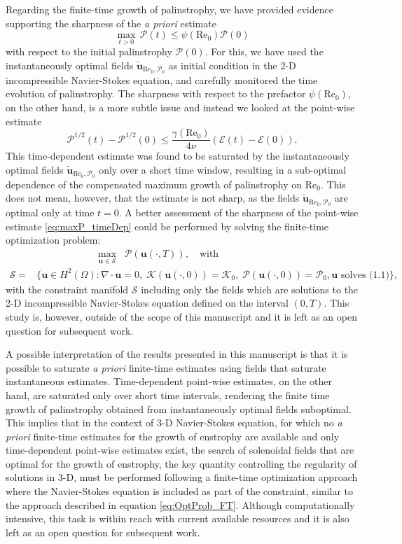 \documentclass[11pt]{article}
\def\E{{\mathcal{E}}}
\def\P{{\mathcal{P}}}
\def\K{{\mathcal{K}}}
\newcommand{\uvec}{\mathbf{u}}
\newcommand{\Reyn}{\textrm{Re}}
\newcommand{\tuvecRP}{\widetilde{\mathbf{u}}_{\Reyn_0,\P_0}}
\begin{document}
Regarding the finite-time growth of palinstrophy, we have provided evidence supporting the sharpness of the \emph{a priori} estimate
\[
\mathop{\max}_{t > 0} \, \P(t) \leq \psi(\Reyn_0) \P(0)
\]
with respect to the initial palinstrophy $\P(0)$. For this, we have used the instantaneously optimal fields $\tuvecRP$ as initial condition in the 2-D incompressible Navier-Stokes equation, and carefully monitored the time evolution of palinstrophy. The sharpness with respect to the prefactor $\psi(\Reyn_0)$, on the other hand, is a more subtle issue and instead we looked at the point-wise estimate
\[
\P^{1/2}(t) - \P^{1/2}(0) \leq \frac{\gamma(\Reyn_0)}{4\nu} \left( \E(t) - \E(0) \right).
\]
This time-dependent estimate was found to be saturated by the instantaneously optimal fields 
$\tuvecRP$ only over a short time window, resulting in a sub-optimal dependence of the compensated maximum growth of palinstrophy on $\Reyn_0$. This does not mean, however, that the estimate is not sharp, as the fields $\tuvecRP$ are optimal only at time $t=0$. A better assessment of the sharpness of the point-wise estimate \eqref{eq:maxP_timeDep} could be performed by solving the finite-time optimization problem:
\begin{equation}\label{eq:OptProb_FT}
\begin{aligned}
 & \qquad\qquad\qquad\mathop{\max}_{\uvec\in\mathcal{S}} \;\; \P(\uvec(\cdot,T)), 
\quad {\textrm{with}}\\
\mathcal{S} = & \{ \uvec\in H^2(\Omega) : \nabla\cdot\uvec = 0, \;  \K(\uvec(\cdot,0)) =\K_0, \; \P(\uvec(\cdot,0)) = \P_0, \uvec\mbox{ solves (1.1)} \},
\end{aligned}
\end{equation}
with the constraint manifold $\mathcal{S}$ including only the fields which are solutions to the 2-D incompressible Navier-Stokes equation defined on the interval $(0,T)$. This study is, however, outside of the scope of this manuscript and it is left as an open question for subsequent work.

A possible interpretation of the results presented in this manuscript is that it is possible to saturate \emph{a priori} finite-time estimates using fields that saturate instantaneous estimates. Time-dependent point-wise estimates, on the other hand, are saturated only over short time intervals, rendering the finite time growth of palinstrophy obtained from instantaneously optimal fields suboptimal. This implies that in the context of 3-D Navier-Stokes equation, for which no \emph{a priori} finite-time estimates for the growth of enstrophy are available and only time-dependent point-wise estimates exist, the search of solenoidal fields that are optimal for the growth of enstrophy, the key quantity controlling the regularity of solutions in 3-D, must be performed following a finite-time optimization approach where the Navier-Stokes equation is included as part of the constraint, similar to the approach described in equation \eqref{eq:OptProb_FT}. Although computationally intensive, this task is within reach with current available resources and it is also left as an open question for subsequent work. 
\end{document}

